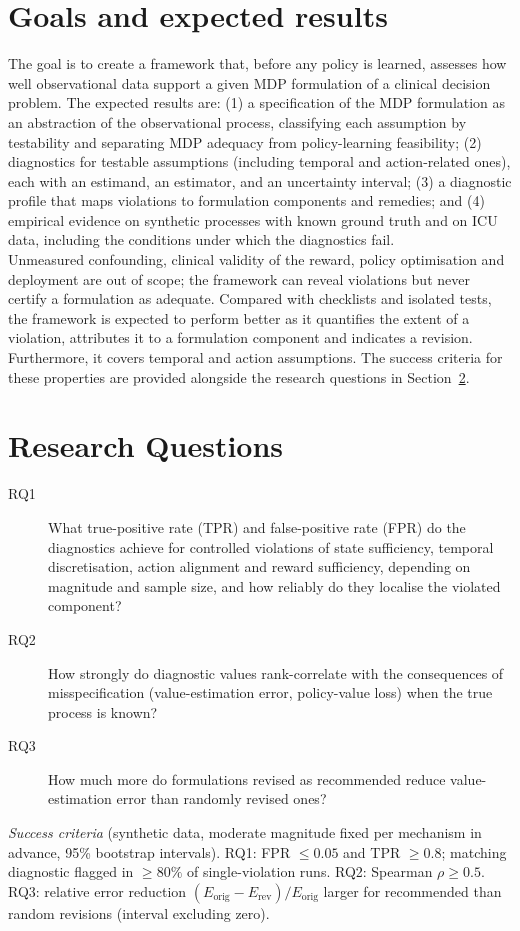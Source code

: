 \documentclass[runningheads]{llncs}
\begin{document}
\section{Goals and expected results}
The goal is to create a framework that, before any policy is learned, assesses how well observational data support a given MDP formulation of a clinical decision problem. The expected results are: (1) a specification of the MDP formulation as an abstraction of the observational process, classifying each assumption by testability and separating MDP adequacy from policy-learning feasibility; (2) diagnostics for testable assumptions (including temporal and action-related ones), each with an estimand, an estimator, and an uncertainty interval; (3) a diagnostic profile that maps violations to formulation components and remedies; and (4) empirical evidence on synthetic processes with known ground truth and on ICU data, including the conditions under which the diagnostics fail. \\
Unmeasured confounding, clinical validity of the reward, policy optimisation and deployment are out of scope; the framework can reveal violations but never certify a formulation as adequate. Compared with checklists and isolated tests, the framework is expected to perform better as it quantifies the extent of a violation, attributes it to a formulation component and indicates a revision. Furthermore, it covers temporal and action assumptions. The success criteria for these properties are provided alongside the research questions in Section~\ref{sec:rq}.

\section{Research Questions}
\label{sec:rq}
\begin{description}
  \item[RQ1] What true-positive rate (TPR) and false-positive rate (FPR) do the diagnostics achieve for controlled violations of state sufficiency, temporal discretisation, action alignment and reward sufficiency, depending on magnitude and sample size, and how reliably do they localise the violated component?
  \item[RQ2] How strongly do diagnostic values rank-correlate with the consequences of misspecification (value-estimation error, policy-value loss) when the true process is known?
  \item[RQ3] How much more do formulations revised as recommended reduce value-estimation error than randomly revised ones?
\end{description}
\emph{Success criteria} (synthetic data, moderate magnitude fixed per mechanism in advance, 95\% bootstrap intervals). RQ1: FPR $\le 0.05$ and TPR $\ge 0.8$; matching diagnostic flagged in $\ge 80\%$ of single-violation runs. RQ2: Spearman $\rho \ge 0.5$. RQ3: relative error reduction $(E_\mathrm{orig}-E_\mathrm{rev})/E_\mathrm{orig}$ larger for recommended than random revisions (interval excluding zero).
\end{document}
